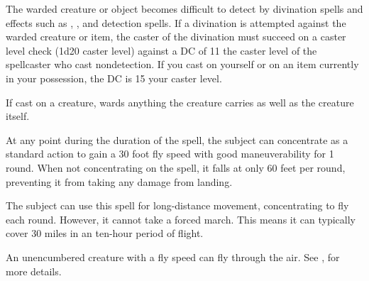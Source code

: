 \begin{spelleffect}
The warded creature or object becomes difficult to detect by divination spells and effects such as , , and detection spells. If a divination is attempted against the warded creature or item, the caster of the divination must succeed on a caster level check (1d20 \add caster level) against a DC of 11 \add the caster level of the spellcaster who cast nondetection. If you cast  on yourself or on an item currently in your possession, the DC is 15 \add your caster level.
\end{spelleffect}
\begin{spellnotes}
If cast on a creature,  wards anything the creature carries as well as the creature itself.
\end{spellnotes}

\begin{comment}
\spellsection{Obscure Object}
\spellschool{Abjuration (Shielding)}
\spellskill{Spellcraft}
\spelllvl{Arcane 3, Divine 3}
\spelltime{1 standard action}
\spellrng{Touch}
\spelltgt{One object touched of up to 100 lb./level}
\spelldur{\durext (D)}
\spellsave{Will negates (object)}
\spellsr{Yes (object)}
\begin{spelleffect}
This spell hides an object from location by divination (scrying) effects, such as the \spell{scrying} spell or a crystal ball. Such an attempt automatically fails (if the divination is targeted on the object) or fails to perceive the object (if the divination is targeted on a nearby location, object, or person).
\end{spelleffect}
\end{comment}

\spelldur{\durext}
\begin{spelleffect}
  At any point during the duration of the spell, the subject can concentrate as a standard action to gain a 30 foot fly speed with good maneuverability for 1 round. When not concentrating on the spell, it falls at only 60 feet per round, preventing it from taking any damage from landing.

  The subject can use this spell for long-distance movement, concentrating to fly each round. However, it cannot take a forced march. This means it can typically cover 30 miles in an ten-hour period of flight.
\end{spelleffect}
\begin{spellnotes}
    An unencumbered creature with a fly speed can fly through the air. See , for more details.
\end{spellnotes}

